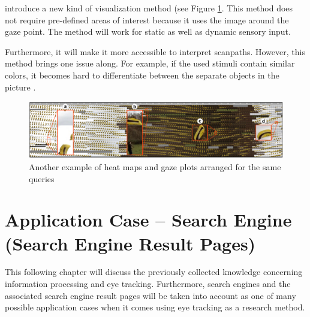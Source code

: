 \textcite[]{kurzhals2016gaze} introduce a new kind of visualization method (see Figure \ref{figure:GazeStripes}. This method does not require pre-defined areas of interest because it uses the image around the gaze point. The method will work for static as well as dynamic sensory input. 

Furthermore, it will make it more accessible to interpret scanpaths. However, this method brings one issue along. For example, if the used stimuli contain similar colors, it becomes hard to differentiate between the separate objects in the picture \autocite[]{kurzhals2016gaze}.

\begin{figure}[!ht]
    \centering
    \includegraphics[width=1\linewidth]{images/GazeStripes_kurzhals2016gaze.png}
    \caption{
       Another example of heat maps and gaze plots  arranged for the same queries \autocite[1005]{kurzhals2016gaze}
    }
    \label{figure:GazeStripes}
\end{figure}


\section{Application Case -- Search Engine (Search Engine Result Pages)}
\label{section:SearchEngine}
This following chapter will discuss the previously collected knowledge concerning information processing and eye tracking. Furthermore, search engines and the associated search engine result pages will be taken into account as one of many possible application cases when it comes using eye tracking as a research method.

